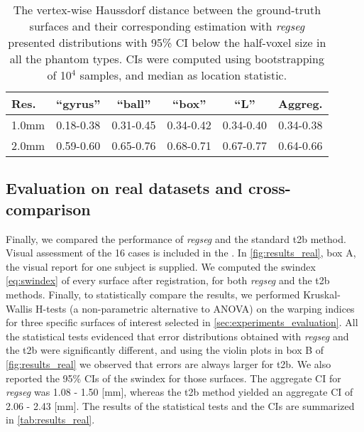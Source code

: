 \begin{table}
		\centering
		\footnotesize
    \tabcolsep=0.1cm
    \begin{tabular}{lccccc}
    Res.   & ``gyrus'' & ``ball''  & ``box''   & ``L''     & Aggreg.    \\\hline
    1.0mm  & 0.18-0.38 & 0.31-0.45 & 0.34-0.42 & 0.34-0.40 & 0.34-0.38  \\
    2.0mm  & 0.59-0.60 & 0.65-0.76 & 0.68-0.71 & 0.67-0.77 & 0.64-0.66  \\
    \hline
    \end{tabular}
    \caption{The vertex-wise Haussdorf distance between the ground-truth surfaces and their
    corresponding estimation with \emph{regseg} presented distributions with 95\% CI below
    the half-voxel size in all the phantom types.
    CIs were computed using bootstrapping of 10$^4$ samples, and median as location statistic.}\label{tab:ci_phantom}
\end{table}

\subsection{Evaluation on real datasets and cross-comparison}\label{sec:results_hcp}
%
Finally, we compared the performance of \emph{regseg} and the standard \gls*{t2b}
  method.
Visual assessment of the 16 cases is included in the .
In \autoref{fig:results_real}, box A, the visual report for one subject is supplied.
We computed the \gls*{swindex} \eqref{eq:swindex} of every surface after registration,
  for both \emph{regseg} and the \gls*{t2b} methods.
Finally, to statistically compare the results, we performed Kruskal-Wallis H-tests
  (a non-parametric alternative to ANOVA) on the warping indices for three specific 
  surfaces of interest selected in \autoref{sec:experiments_evaluation}.
All the statistical tests evidenced that error distributions obtained with \emph{regseg} and
  the \gls*{t2b} were significantly different, and using the violin plots in box B of
  \autoref{fig:results_real} we observed that errors are always larger for \gls*{t2b}.
We also reported the 95\% CIs of the \gls*{swindex} for those surfaces.
The aggregate CI for \emph{regseg} was 1.08 - 1.50 [mm], whereas the \gls*{t2b} method
  yielded an aggregate CI of 2.06 - 2.43 [mm].
The results of the statistical tests and the CIs are summarized in \autoref{tab:results_real}.



